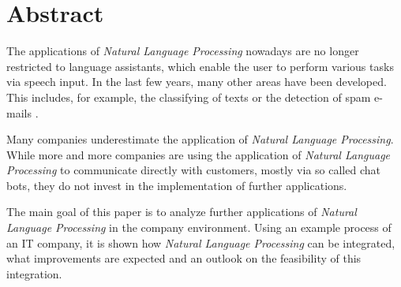 \chapter{Abstract}
The applications of \textit{Natural Language Processing} nowadays are no longer restricted to language assistants, which enable the user to perform various tasks via speech input. In the last few years, many other areas have been developed. This includes, for example, the classifying of texts or the detection of spam e-mails \cite{DannReconstructing}\cite{Rohit2014}.

Many companies underestimate the application of \textit{Natural Language Processing}. While more and more companies are using the application of \textit{Natural Language Processing} to communicate directly with customers, mostly via so called chat bots, they do not invest in the implementation of further applications.

The main goal of this paper is to analyze further applications of \textit{Natural Language Processing} in the company environment. Using an example process of an IT company, it is shown how \textit{Natural Language Processing} can be integrated, what improvements are expected and an outlook on the feasibility of this integration.